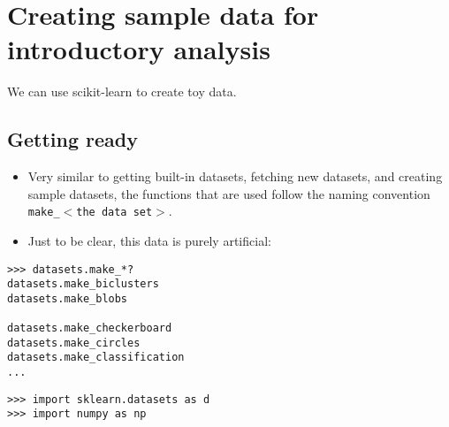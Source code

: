 \documentclass[SKL-MASTER.tex]{subfiles}
\begin{document}
	\Large
\section*{Creating sample data for introductory analysis}
We can use scikit-learn to create toy data.
\subsection*{Getting ready}
\begin{itemize}
\item Very similar to getting built-in datasets, fetching new datasets, and creating sample datasets,
the functions that are used follow the naming convention \texttt{make\_$<$the data set$>$}. 
\item Just to
be clear, this data is purely artificial:
\end{itemize}


\begin{framed}
\begin{verbatim}
>>> datasets.make_*?
datasets.make_biclusters
datasets.make_blobs

datasets.make_checkerboard
datasets.make_circles
datasets.make_classification
...
\end{verbatim}
\end{framed}
\begin{framed}
	\begin{verbatim}
>>> import sklearn.datasets as d
>>> import numpy as np
\end{verbatim}
\end{framed}
\newpage
\end{document}

